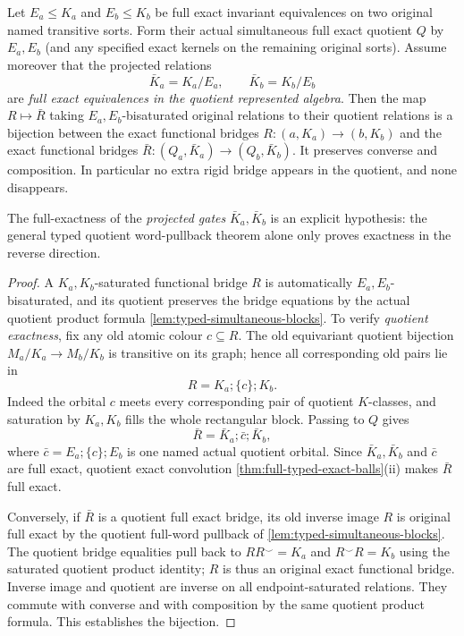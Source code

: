 \begin{lemma}
\label{lem:foundational-rigid-quotient-bridge}
Let $E_a\le K_a$ and $E_b\le K_b$ be
full exact invariant equivalences on two
original named transitive sorts. Form their
actual simultaneous full exact quotient
$Q$ by $E_a,E_b$ (and any specified exact
kernels on the remaining original sorts).
Assume moreover that the projected
relations
\[
 \bar K_a=K_a/E_a,\qquad \bar K_b=K_b/E_b
\]
are \emph{full exact equivalences in the
quotient represented algebra}.
Then the map $R\mapsto\bar R$ taking
$E_a,E_b$-bisaturated original relations
to their quotient relations is a bijection
between the exact functional bridges
$R:(a,K_a)\to(b,K_b)$ and the exact
functional bridges
$\bar R:(Q_a,\bar K_a)\to(Q_b,\bar K_b)$.
It preserves converse and composition.
In particular no extra rigid bridge appears
in the quotient, and none disappears.

The full-exactness of the \emph{projected
gates} $\bar K_a,\bar K_b$ is an explicit
hypothesis: the general typed quotient
word-pullback theorem alone only proves
exactness in the reverse direction.
\end{lemma}
\begin{proof}
A $K_a,K_b$-saturated functional bridge
$R$ is automatically $E_a,E_b$-bisaturated,
and its quotient preserves the bridge
equations by the actual quotient product
formula
\cref{lem:typed-simultaneous-blocks}.
To verify \emph{quotient exactness},
fix any old atomic colour $c\subseteq R$.
The old equivariant quotient bijection
$M_a/K_a\to M_b/K_b$ is transitive on
its graph; hence all corresponding old
pairs lie in
\[
                   R=K_a;\{c\};K_b.
\]
Indeed the orbital $c$ meets every
corresponding pair of quotient $K$-classes,
and saturation by $K_a,K_b$ fills the whole
rectangular block. Passing to $Q$ gives
\[
             \bar R=\bar K_a;\bar c;\bar K_b,
\]
where $\bar c=E_a;\{c\};E_b$ is one
named actual quotient orbital. Since
$\bar K_a,\bar K_b$ and $\bar c$ are
full exact, quotient exact convolution
\cref{thm:full-typed-exact-balls}(ii)
makes $\bar R$ full exact.

Conversely, if $\bar R$ is a quotient
full exact bridge, its old inverse image
$R$ is original full exact by the
quotient full-word pullback of
\cref{lem:typed-simultaneous-blocks}.
The quotient bridge equalities pull
back to $RR^\smile=K_a$ and
$R^\smile R=K_b$ using the saturated
quotient product identity; $R$ is
thus an original exact functional bridge.
Inverse image and quotient are inverse
on all endpoint-saturated relations.
They commute with converse and with
composition by the same quotient product
formula. This establishes the bijection.
\end{proof}

